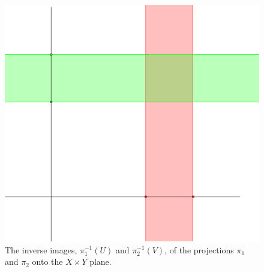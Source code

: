 \begin{figure}[h]
    \centering
    \includegraphics[scale = 0.5]{Figures/Chapter1/projections.png}
    \caption{The inverse images, $\pi_1^{-1}(U)$ and $\pi_2^{-1}(V)$, of the
    projections $\pi_1$ and $\pi_2$ onto the $X \times Y$ plane.}
    \label{fig1.5}
\end{figure}
